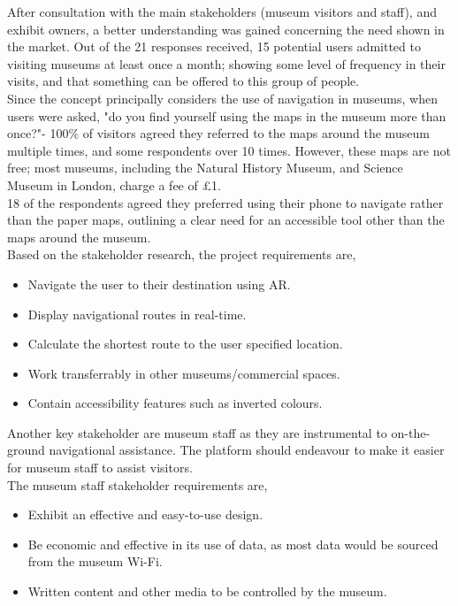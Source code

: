 
After consultation with the main stakeholders (museum visitors and staff), and exhibit owners, a better understanding was gained concerning the need shown in the market. Out of the 21 responses received, 15 potential users admitted to visiting museums at least once a month; showing some level of frequency in their visits, and that something can be offered to this group of people.\\

Since the concept principally considers the use of navigation in museums, when users were asked, "do you find yourself using the maps in the museum more than once?"- 100\% of visitors agreed they referred to the maps around the museum multiple times, and some respondents over 10 times. However, these maps are not free; most museums, including the Natural History Museum, and Science Museum in London, charge a fee of £1.\\

18 of the respondents agreed they preferred using their phone to navigate rather than the paper maps, outlining a clear need for an accessible tool other than the maps around the museum.\\

Based on the stakeholder research, the project requirements are, 
\begin{itemize}
    \item Navigate the user to their destination using AR.
    \item Display navigational routes in real-time.
    \item Calculate the shortest route to the user specified location.
    \item Work transferrably in other museums/commercial spaces.
    \item Contain accessibility features such as inverted colours.
\end{itemize}

Another key stakeholder are museum staff as they are instrumental to on-the-ground navigational assistance. The platform should endeavour to make it easier for museum staff to assist visitors.\\

The museum staff stakeholder requirements are,
\begin{itemize}
    \item Exhibit an effective and easy-to-use design. 
    \item Be economic and effective in its use of data, as most data would be sourced from the museum Wi-Fi. 
    \item Written content and other media to be controlled by the museum.
\end{itemize}

